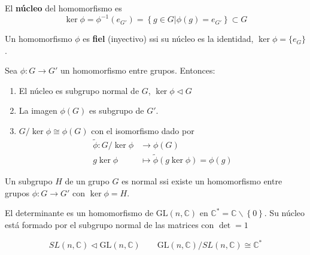 \begin{definicion}
El \textbf{núcleo} del homomorfismo es
\begin{equation}
\ker \phi= \phi^{-1}(e_{G'})=\left\{g\in G |\phi(g)=e_{G'}\right \}\subset G
\end{equation}
\end{definicion}

\begin{proposicion}
Un homomorfismo $\phi$ es \textbf{fiel} (inyectivo) ssi su núcleo es la identidad, $\ker\phi=\{e_G\}$.
\end{proposicion}

\begin{teorema}
Sea $\phi:G\rightarrow G'$ un homomorfismo entre grupos. Entonces:

\begin{enumerate}[label=\roman*)]
\item El núcleo es subgrupo normal de $G$, $\ker\phi \triangleleft G$
\item La imagen $\phi(G)$ es subgrupo de $G'$.
\item $G/\ker\phi \cong \phi(G)$ con el isomorfismo dado por
\begin{subequations}
\begin{flalign}
 \tilde{\phi}: G/\ker\phi &\rightarrow \phi(G)\\
 g\ker \phi &\mapsto \tilde{\phi} (g\ker\phi)=\phi (g)
\end{flalign}
\end{subequations}
\end{enumerate}


\end{teorema}

\begin{corolario}
Un subgrupo $H$ de un grupo $G$ es normal ssi existe un homomorfismo entre grupos $\phi:G\rightarrow G'$ con $\ker\phi=H$.
\end{corolario}

\begin{ejemplo}
El determinante es un homomorfismo de $\mathrm{GL}(n,\mathbb{C})$ en $\mathbb{C}^\ast=\mathbb{C}\backslash \left\{0\right\} $. Su núcleo está formado por el subgrupo normal de las matrices con $\det =1$

\begin{equation}
SL(n,\mathbb{C}) \triangleleft \mathrm{GL}(n,\mathbb{C})\qquad \mathrm{GL}(n,\mathbb{C})/SL(n,\mathbb{C})\cong \mathbb{C}^\ast %
\end{equation}
\end{ejemplo}

